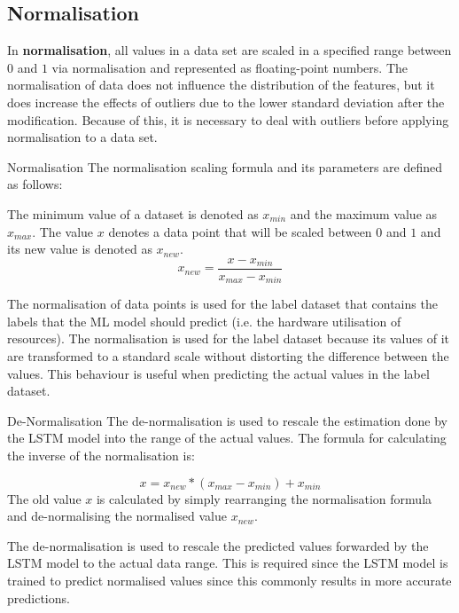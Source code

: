     \subsection{Normalisation}
    \label{sec:data-normalisation-data-preprocessing-architecture}

      In \textbf{normalisation}, all values in a data set are scaled in a specified range between $0$ and $1$ via normalisation and represented as floating-point numbers.
      The normalisation of data does not influence the distribution of the features, but it does increase the effects of outliers due to the lower standard deviation after the modification. Because of this, it is necessary to deal with outliers before applying normalisation to a data set.
      
      \begin{pabox}{Normalisation}
        \label{def:normalisation}
        The normalisation scaling formula and its parameters are defined as follows:

        The minimum value of a dataset is denoted as $x_{min}$ and the maximum value as $x_{max}$.
        The value $x$ denotes a data point that will be scaled between $0$ and $1$ and its new value is denoted as $x_{new}$.
        $$x_{new} = \frac{x - x_{min}}{x_{max} - x_{min}}$$

        
      \end{pabox}
      The normalisation of data points is used for the label dataset that contains the labels that the ML model should predict (i.e. the hardware utilisation of resources). The normalisation is used for the label dataset because its values of it are transformed to a standard scale without distorting the difference between the values. This behaviour is useful when predicting the actual values in the label dataset.

      \begin{pabox}{De-Normalisation}
        The de-normalisation is used to rescale the estimation done by the LSTM model into the range of the actual values. The formula for calculating the inverse of the normalisation is:

        $$x = x_{new} * (x_{max} - x_{min}) + x_{min}$$
        The old value $x$ is calculated by simply rearranging the normalisation formula and de-normalising the normalised value $x_{new}$.
      \end{pabox}
      The de-normalisation is used to rescale the predicted values forwarded by the LSTM model to the actual data range.
      This is required since the LSTM model is trained to predict normalised values since this commonly results in more accurate predictions.
    
